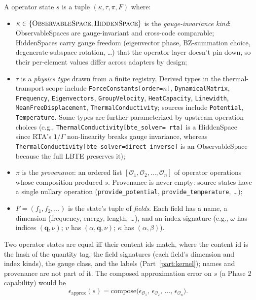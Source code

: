 \documentclass[11pt,a4paper]{article}
\begin{document}
\medskip

A operator state $s$ is a tuple $(\kappa, \tau, \pi, F)$ where:
\begin{itemize}[leftmargin=2em]
  \item $\kappa \in \{\textsc{ObservableSpace}, \textsc{HiddenSpace}\}$ is the
        \emph{gauge-invariance kind}: ObservableSpaces are gauge-invariant and cross-code
        comparable; HiddenSpaces carry gauge freedom (eigenvector phase, BZ-summation
        choice, degenerate-subspace rotation, …) that the operator layer doesn't pin down,
        so their per-element values differ across adapters by design;
  \item $\tau$ is a \emph{physics type} drawn from a finite registry. Derived types in
        the thermal-transport scope include \texttt{ForceConstants[order=$n$]},
        \texttt{DynamicalMatrix}, \texttt{Frequency}, \texttt{Eigenvectors},
        \texttt{GroupVelocity}, \texttt{HeatCapacity}, \texttt{Linewidth},
        \texttt{MeanFreeDisplacement}, \texttt{ThermalConductivity}; sources include
        \texttt{Potential}, \texttt{Temperature}. Some types are further parameterized
        by upstream operation choices (e.g., \texttt{ThermalConductivity[bte\_solver=
        rta]} is a HiddenSpace since RTA's $1/\Gamma$ non-linearity breaks gauge
        invariance, whereas \texttt{ThermalConductivity[bte\_solver=direct\_inverse]}
        is an ObservableSpace because the full LBTE preserves it);
  \item $\pi$ is the \emph{provenance}: an ordered list $[\mathcal{O}_1, \mathcal{O}_2,
        \ldots, \mathcal{O}_n]$ of operator operations whose composition produced $s$.
        Provenance is never empty: source states have a single nullary operation
        (\texttt{provide\_potential}, \texttt{provide\_temperature}, \ldots);
  \item $F = (f_1, f_2, \ldots)$ is the state's tuple of \emph{fields}. Each field has
        a name, a dimension (frequency, energy, length, …), and an index signature
        (e.g., $\omega$ has indices $(\mathbf{q}, \nu)$; $v$ has $(\alpha, \mathbf{q},
        \nu)$; $\kappa$ has $(\alpha, \beta)$).
\end{itemize}
Two operator states are equal iff their content ids match, where the content id is
the hash of the quantity tag, the field signatures (each field's dimension and
index kinds), the gauge class, and the labels (Part~\ref{part:kernel}); names and
provenance are not part of it. The composed approximation error
on $s$ (a Phase 2 capability) would be
\begin{equation}
  \epsilon_{\text{approx}}(s) = \mathrm{compose}\bigl(\epsilon_{\mathcal{O}_1},\, \epsilon_{\mathcal{O}_2},\, \ldots,\, \epsilon_{\mathcal{O}_n}\bigr).
\end{equation}
\end{document}
